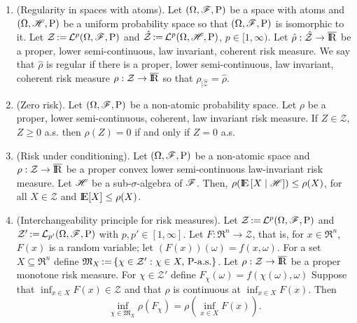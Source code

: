 \documentclass[a4paper,10pt]{scrbook}
\newcommand{\ce}[1]{\E\left[#1 {}\mid{} \HH \right]}
\begin{document}
\begin{enumerate}
 \item (Regularity in spaces with atoms). Let $(\Omega,\mathscr{F},\mathrm{P})$ be a space with atoms and 
       $(\Omega, \mathscr{H}, \mathrm{P})$ be a uniform probability space so that $(\Omega,\mathscr{F},\mathrm{P})$ is 
       isomorphic to it. 
       Let $\mathcal{Z}{}\mathop{\mathrel{:}=}{} \mathcal{L}^p(\Omega,\mathscr{F},\mathrm{P})$ and $\hat{\mathcal{Z}} {}\mathop{\mathrel{:}=}{} 
       \mathcal{L}^p(\Omega, \mathscr{H}, \mathrm{P})$, $p\in[1,\infty)$. 
       Let $\hat{\rho}:\hat{\mathcal{Z}}\to\barre$ be a proper, lower semi-continuous,
       law invariant, coherent risk measure. We say that $\hat{\rho}$ is regular 
       if there is a proper, lower semi-continuous, law invariant, coherent 
       risk measure $\rho:\mathcal{Z}\to\barre$ so that $\rho_{|\hat{\mathcal{Z}}}=\hat{\rho}$.
       
 \item (Zero risk). Let $(\Omega,\mathscr{F},\mathrm{P})$ be a non-atomic probability space. Let $\rho$ be a proper, lower semi-continuous,
       coherent, law invariant risk measure. If $Z\in\mathcal{Z}$, $Z\geq 0$ a.s. then $\rho(Z)=0$ if and only if $Z=0$ a.s.
 \item (Risk under conditioning). Let $(\Omega,\mathscr{F},\mathrm{P})$ be a non-atomic space and $\rho:\mathcal{Z}\to\barre$ be a 
        proper convex lower semi-continuous  law-invariant risk measure. Let $\mathscr{H}$ be a sub-$\sigma$-algebra 
        of $\mathscr{F}$. Then, $\rho(\ce{X})\leq \rho(X)$, for all $X\in\mathcal{Z}$ and $\E[X]\leq \rho(X)$.
  \item (Interchangeability principle for risk measures). Let $\mathcal{Z}{}\mathop{\mathrel{:}=}{} \mathcal{L}^p(\Omega,\mathscr{F},\mathrm{P})$ and 
       $\mathcal{Z}' {}\mathop{\mathrel{:}=}{} \mathcal{L}_{p'}(\Omega,\mathscr{F},\mathrm{P})$ with $p,p'\in[1,\infty]$. 
       Let $F:\Re^n\to\mathcal{Z}$, that is, for $x\in\Re^n$, $F(x)$ is a random variable; let
       $(F(x))(\omega)=f(x,\omega)$. For a set $X\subseteq \Re^n$ define 
       $\mathfrak{M}_X {}\mathop{\mathrel{:}=}{} \{\chi \in \mathcal{Z}': \chi \in X,\, \mathrm{P}\text{-a.s.}\}$.
       Let $\rho:\mathcal{Z}\to\barre$ be a proper monotone risk measure. 
       For $\chi\in\mathcal{Z}'$ define $F_\chi(\omega) = f(\chi(\omega), \omega)$
       Suppose that $\inf_{x\in X}F(x) \in \mathcal{Z}$
       and that $\rho$ is continuous at $\inf_{x\in X}F(x)$. Then
       \[
        \inf_{\chi \in \mathfrak{M}_X} \rho(F_\chi) = \rho\left(\inf_{x\in X}F(x)\right).
       \]     
\end{enumerate}
\end{document}
